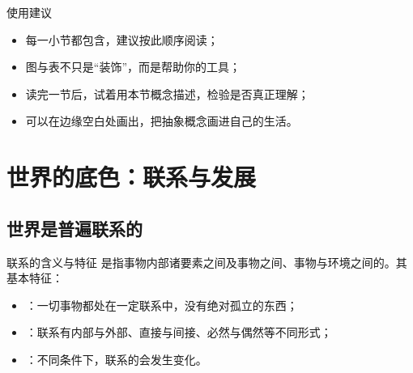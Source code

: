 \documentclass[a4paper,11pt]{ctexart}
\begin{document}
\begin{roadmap}
\end{roadmap}

\begin{notebox}{使用建议}
\begin{itemize}
  \item 每一小节都包含，建议按此顺序阅读；
  \item 图与表不只是“装饰”，而是帮助你的工具；
  \item 读完一节后，试着用本节概念描述，检验是否真正理解；
  \item 可以在边缘空白处画出，把抽象概念画进自己的生活。
\end{itemize}
\end{notebox}

\section{世界的底色：联系与发展}

\subsection{世界是普遍联系的}

\begin{definitionbox}{联系的含义与特征}
是指事物内部诸要素之间及事物之间、事物与环境之间的。其基本特征：
\begin{itemize}
  \item {}：一切事物都处在一定联系中，没有绝对孤立的东西；
  \item {}：联系有内部与外部、直接与间接、必然与偶然等不同形式；
  \item {}：不同条件下，联系的会发生变化。
\end{itemize}
\end{definitionbox}
\end{document}
